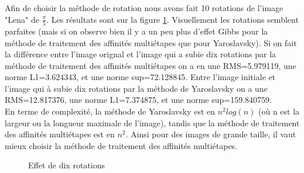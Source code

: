 Afin de choisir la méthode de rotation nous avons fait 10 rotations de l'image "Lena" de $\frac{\pi}{5}$. Les résultats sont sur la figure \ref{rotalena}. Visuellement les rotations semblent parfaites (mais si on observe bien il y a un peu plus d'effet Gibbs pour la méthode de traitement des affinités multiétapes que pour Yaroslavsky). Si on fait la différence entre l'image orignal et l'image qui a subie dix rotations par la méthode de traitement des affinités multiétapes on a en une RMS=5.979119, une norme L1=3.624343, et une norme sup=72.128845. Entre l'image initiale et l'image qui à subie dix rotations par la méthode de Yaroslavsky on a une RMS=12.817376, une norme L1=7.374875, et une norme sup=159.840759. \\

En terme de complexité, la méthode de Yaroslavsky est en $n^2 log(n)$ (où n est la largeur ou la longueur maximale de l'image), tandis que la méthode de traitement des affinités multiétapes est en $n^2$. Ainsi pour des images de grande taille, il vaut mieux choisir la méthode de traitement des affinités multiétapes.

 \begin{figure}
 
   \centering
   \caption{Effet de dix rotations}
\label{rotalena}
 \end{figure}
